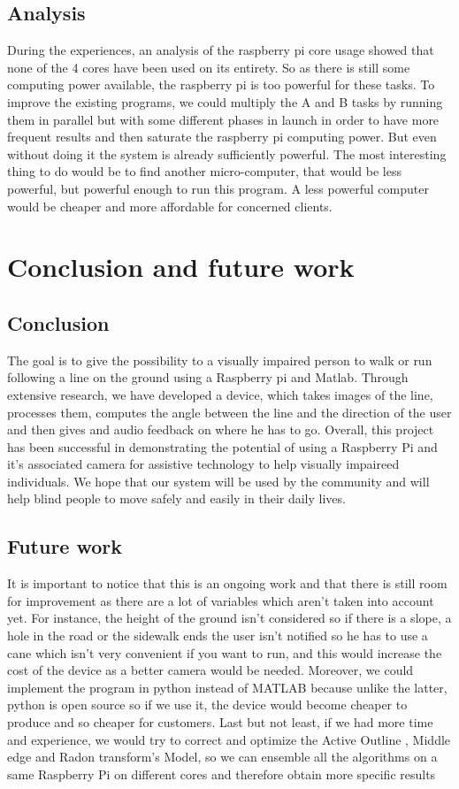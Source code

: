 \documentclass{article}
\begin{document}
\subsection{Analysis}
During the experiences, an analysis of the raspberry pi core usage showed that none of the 4 cores have been used on its entirety. So as there is still some computing power available, the raspberry pi is too powerful for these tasks. 
To improve the existing programs, we could multiply the A and B tasks by running them in parallel but with some different phases in launch in order to have more frequent results and then saturate the raspberry pi computing power.  But even without doing it the system is already sufficiently powerful.  
The most interesting thing to do would be to find another micro-computer, that would be less powerful, but powerful enough to run this program. A less powerful computer would be cheaper and more affordable for concerned clients. 

\section{Conclusion and future work}

\subsection{Conclusion}
The goal is to give the possibility to a visually impaired person to walk or run following a line on the ground using a Raspberry pi and Matlab. Through extensive research, we have developed a device, which takes images of the line, processes them, computes the angle between the line and the direction of the user and then gives and audio feedback on where he has to go.
Overall, this project has been successful in demonstrating the potential of using a Raspberry Pi and it’s associated camera for assistive technology to help visually impaireed individuals. We hope that our system will be used by the community and will help blind people to move safely and easily in their daily lives. 

\subsection{Future work }
It is important to notice that this is an ongoing work and that there is still room for improvement as there are a lot of variables which aren’t taken into account yet. 
For instance, the height of the ground isn’t considered so if there is a slope, a hole in the road or the sidewalk ends the user isn’t notified so he has to use a cane which isn’t very convenient if you want to run, and this would increase the cost of the device as a better camera would be needed. 
Moreover, we could implement the program in python instead of MATLAB because unlike the latter, python is open source so if we use it, the device would become cheaper to produce and so cheaper for customers.
Last but not least, if we had more time and experience, we would try to correct and optimize the Active Outline , Middle edge and Radon transform’s Model, so we can ensemble all the algorithms on a same Raspberry Pi on different cores and therefore obtain more specific results
\end{document}
